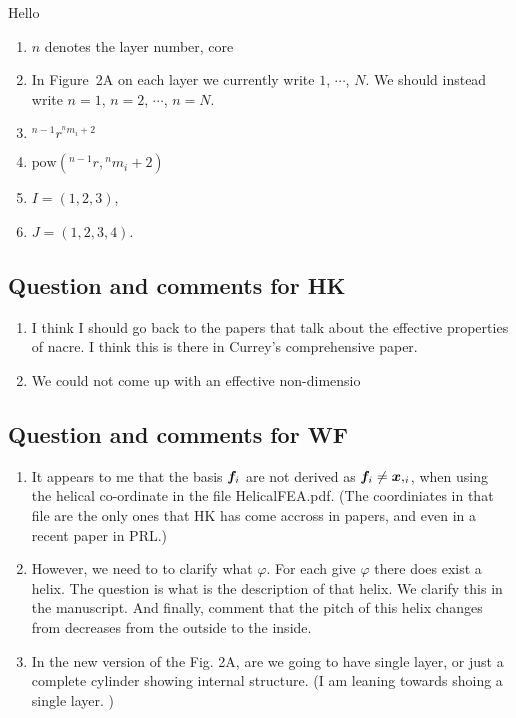 \documentclass[10pt,times]{article}
\begin{document}
Hello


\begin{enumerate}
    \item $n$ denotes the layer number, core
    \item In Figure~2A on each layer we currently write  $1$, $\cdots$, $N$. We should instead write $n=1$, $n=2$,  $\cdots$, $n=N$. 
    \item $^{n-1}\!{r}^{{}^{n}\!{m_{i}}+2}$
    \item $\text{pow}(^{n-1}\!{r},{{}^{n}\!{m_{i}}+2})$
    \item $I=(1,2,3)$, 
    \item $J=(1,2,3,4)$. 
\end{enumerate}

\subsection{Question and comments for HK}
\begin{enumerate}
    \item I think I should go back to the papers that talk about the effective properties of nacre. I think this is there in Currey's comprehensive paper.
    \item We could not come up with an effective non-dimensio
\end{enumerate}

\subsection{Question and comments for WF}
\begin{enumerate}
    \item It appears to me that the basis $\boldsymbol{f}_i$ are not derived as $\boldsymbol{f}_i \neq \boldsymbol{x},_{i} $, when using the helical co-ordinate in the file HelicalFEA.pdf. (The coordiniates in that file are the only ones that HK has come accross in papers, and even in a recent paper in PRL.)
    \item However, we need to to clarify what $\varphi$. For each give $\varphi$ there does exist a helix. The question is what is the description of that helix. We clarify this in the manuscript. And finally, comment that the pitch of this helix changes from decreases from the outside to the inside.
    \item In the new version of the Fig. 2A, are we going to have single layer, or just a complete cylinder showing internal structure. (I am leaning towards shoing a single layer. ) 
\end{enumerate}
\end{document}
